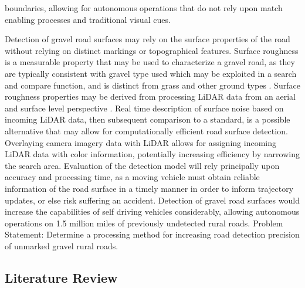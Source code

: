 \documentclass[journal,onecolumn]{IEEEtran}
\begin{document}
boundaries, allowing for autonomous operations that do not rely upon match enabling processes and traditional visual cues. 

	{Detection of gravel road surfaces may rely on the surface properties of the road without relying on distinct markings or topographical features. Surface roughness is a measurable property that may be used to characterize a gravel road, as they are typically consistent with gravel type used \cite{skorseth_gravel_nodate} which may be exploited in a search and compare function, and is distinct from grass and other ground types \cite{wan_road_2007, levi_3d_2012_light, levi_3d_2012_terrain}. Surface roughness properties may be derived from processing LiDAR data from an aerial and surface level perspective \cite{wan_road_2007, levi_3d_2012_light, levi_3d_2012_terrain, pollyea_experimental_2012,rychkov_computational_2012,lague_accurate_2013,brubaker_use_2013,turner_estimation_2014,campbell_lidar-based_2017,shepard_roughness_2001,tegowski_statistical_2016,sock_probabilistic_2016,milenkovic_roughness_2018,yadav_extraction_2017, yadav_rural_2018}. Real time description of surface noise based on incoming LiDAR data, then subsequent comparison to a standard, is a possible alternative that may allow for computationally efficient road surface detection. Overlaying camera imagery data with LiDAR allows for assigning incoming LiDAR data with color information, potentially increasing efficiency by narrowing the search area. Evaluation of the detection model will rely principally upon accuracy and processing time, as a moving vehicle must obtain reliable information of the road surface in a timely manner in order to inform trajectory updates, or else risk suffering an accident. Detection of gravel road surfaces would increase the capabilities of self driving vehicles considerably, allowing autonomous operations on 1.5 million miles \cite{road_stats_2} of previously undetected rural roads. Problem Statement: Determine a processing method for increasing road detection precision of unmarked gravel rural roads. 
		
\subsection{Literature Review}
	
}
\end{document}
